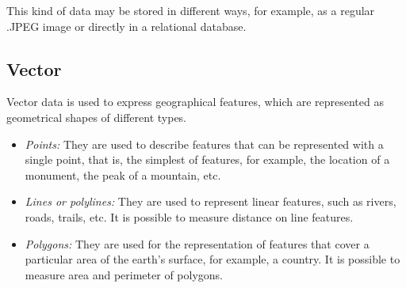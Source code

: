 This kind of data may be stored in different ways, for example, as a regular .JPEG image or directly in a relational database.

\subsection*{Vector}

Vector data is used to express geographical features, which are represented as geometrical shapes of different types.

\begin{itemize}
	\item \emph{Points:} They are used to describe features that can be represented with a single point, that is, the simplest of features, for example, the location of a monument, the peak of a mountain, etc.
	\item \emph{Lines or polylines:} They are used to represent linear features, such as rivers, roads, trails, etc. It is possible to measure distance on line features.
	\item \emph{Polygons:} They are used for the representation of features that cover a particular area of the earth's surface, for example, a country. It is possible to measure area and perimeter of polygons.
\end{itemize}










